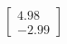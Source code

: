 \documentclass[preview]{standalone}
\begin{document}
\begin{align*}
\begin{bmatrix} 4.98 \\ -2.99 \end{bmatrix}
\end{align*}
\end{document}
